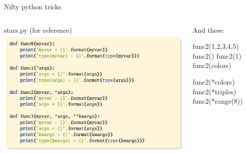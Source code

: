 \documentclass[aspectratio=149] {beamer}
\begin{document}
\begin{frame}[fragile,t]{ Nifty python tricks}

  \begin{columns}
    \begin{column}[t]{.48\textwidth}
      stars.py (for reference)
      \includegraphics[scale=.85, trim= 0 0 7cm 0, clip]{stars.pdf}
    \end{column}
   
    \begin{column}[t]{.48\textwidth}
      And these:
      \begin{pythoncode}
        func2(1,2,3,4,5)
        func2()
        func2(1)
        func2(colors)
      \end{pythoncode}
  
      \pause
      \begin{pythoncode}
        func2(*colors)
        func2(*triples)
        func2(*range(8))
      \end{pythoncode}
    \end{column}
  \end{columns}

\end{frame}
\end{document}
